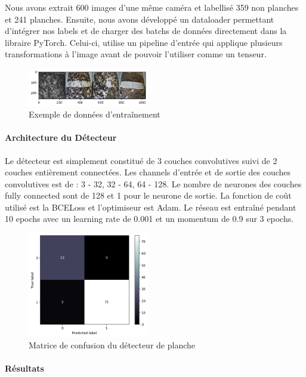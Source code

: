 Nous avons extrait 600 images d'une même caméra et labellisé 359 non planches et 241 planches. Ensuite, nous avons développé un dataloader permettant d'intégrer nos labels et de charger des batchs de données directement dans la libraire PyTorch. Celui-ci, utilise un pipeline d'entrée qui applique plusieurs transformations à l'image avant de pouvoir l'utiliser comme un tenseur.

\begin{figure}[!htb]
    \centering
    \includegraphics[width=200px]{images/filtre_exemple_data}
    \caption{Exemple de données d'entraînement}
    \label{fig:Entraînement du filtre}
\end{figure}

\paragraph*{Architecture du Détecteur}

Le détecteur est simplement constitué de 3 couches convolutives suivi de 2 couches entièrement connectées. Les channels d'entrée et de sortie des couches convolutives est de : 3 - 32, 32 - 64, 64 - 128. Le nombre de neurones des couches fully connected sont de 128 et 1 pour le neurone de sortie. La fonction de coût utilisé est la BCELoss et l'optimiseur est Adam. Le réseau est entraîné pendant 10 epochs avec un learning rate de 0.001 et un momentum de 0.9 sur 3 epochs.

\begin{figure}[!htb]
    \centering
    \includegraphics[width=200px]{images/filtre_cmatrix}
    \caption{Matrice de confusion du détecteur de planche}
    \label{fig:Matrice de confusion du filtre}
\end{figure}

\paragraph*{Résultats}

